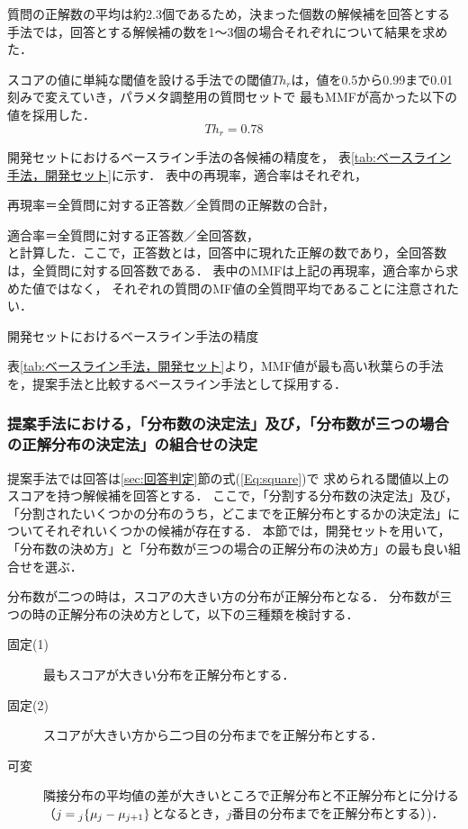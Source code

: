 \documentclass[japanese]{jnlp_1.4}
\newcommand{\argmax}{}
\begin{document}
質問の正解数の平均は約2.3個であるため，決まった個数の解候補を回答とする手法では，回答とする解候補の数を1〜3個の場合それぞれについて結果を求めた．

スコアの値に単純な閾値を設ける手法での閾値$Th_r$は，値を0.5から0.99まで0.01刻みで変えていき，パラメタ調整用の質問セットで
最もMMFが高かった以下の値を採用した．
\begin{equation} 
 Th_r = 0.78
\end{equation}

開発セットにおけるベースライン手法の各候補の精度を，
\pagebreak
表\ref{tab:ベースライン手法，開発セット}に示す．
表中の再現率，適合率はそれぞれ，

再現率＝全質問に対する正答数／全質問の正解数の合計，

適合率＝全質問に対する正答数／全回答数，\\
と計算した．ここで，正答数とは，回答中に現れた正解の数であり，全回答数
は，全質問に対する回答数である．
表中のMMFは上記の再現率，適合率から求めた値ではなく，
それぞれの質問のMF値の全質問平均であることに注意されたい．

\begin{table}[t]
\caption{開発セットにおけるベースライン手法の精度}
\label{tab:ベースライン手法，開発セット}
\begin{center}

\end{center}
\end{table}


表\ref{tab:ベースライン手法，開発セット}より，MMF値が最も高い秋葉らの手法を，提案手法と比較するベースライン手法として採用する．


\subsubsection{提案手法における，「分布数の決定法」及び，「分布数が三つの場合の正解分布の決定法」の組合せの決定}\label{subsubsec:提案手法}

提案手法では回答は\ref{sec:回答判定}節の式(\ref{Eq:square})で
求められる閾値以上のスコアを持つ解候補を回答とする．
ここで，「分割する分布数の決定法」及び，「分割されたいくつかの分布のうち，どこまでを正解分布とするかの決定法」についてそれぞれいくつかの候補が存在する．
本節では，開発セットを用いて，「分布数の決め方」と「分布数が三つの場合の正解分布の決め方」の最も良い組合せを選ぶ．

分布数が二つの時は，スコアの大きい方の分布が正解分布となる．
分布数が三つの時の正解分布の決め方として，以下の三種類を検討する．
\begin{description}
\item[固定(1)] 最もスコアが大きい分布を正解分布とする．
\item[固定(2)] スコアが大きい方から二つ目の分布までを正解分布とする．
\item[可変] 隣接分布の平均値の差が大きいところで正解分布と不正解分布とに分ける（$j=\linebreak\argmax_j \{\mu_j-\mu_{j+1}\}$となるとき，$j$番目の分布までを正解分布とする）)．
\end{description}
\end{document}
